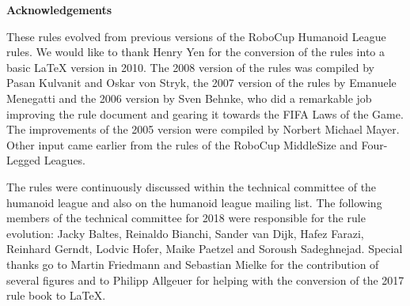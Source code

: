 \bigskip

{\bfseries Acknowledgements}

\headlinebox

These rules evolved from previous versions of the RoboCup Humanoid League rules. We would like to thank Henry Yen for the conversion of the rules into a basic LaTeX version in 2010. The 2008 version of the rules was compiled by Pasan Kulvanit and Oskar von Stryk, the 2007 version of the rules by Emanuele Menegatti and the 2006 version by Sven Behnke, who did a remarkable job improving the rule document and gearing it towards the FIFA Laws of the Game. The improvements of the 2005 version were compiled by Norbert Michael Mayer. Other input came earlier from the rules of the RoboCup MiddleSize and Four-Legged Leagues.

The rules were continuously discussed within the technical committee of the humanoid league and also on the humanoid league mailing list. The following members of the technical committee for 2018 were responsible for the rule evolution: Jacky Baltes, Reinaldo Bianchi, Sander van Dijk, Hafez Farazi, Reinhard Gerndt, Lodvic Hofer, Maike Paetzel and Soroush Sadeghnejad. Special thanks go to Martin Friedmann and Sebastian Mielke for the contribution of several figures and to Philipp Allgeuer for helping with the conversion of the 2017 rule book to LaTeX.
